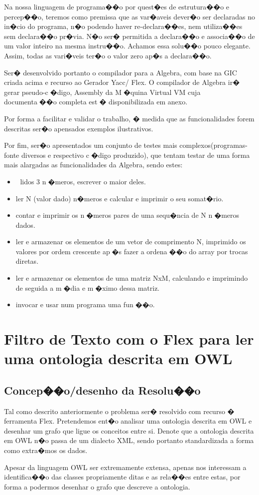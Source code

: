 \documentclass{report}
\begin{document}
Na nossa linguagem de programa��o por quest�es de estrutura��o e percep��o, teremos como premissa que as var�aveis dever�o ser declaradas no in�cio do programa, n�o podendo haver re-declara��es, nem utiliza��es sem declara��o pr�via. N�o ser� permitida a declara��o e associa��o de um valor inteiro na mesma instru��o. Achamos essa solu��o pouco elegante. Assim, todas as vari�veis ter�o o valor zero ap�s a declara��o.\par 

Ser� desenvolvido portanto o compilador para a Algebra, com base na GIC criada acima e recurso ao Gerador Yacc/ Flex.
O compilador de Algebra ir� gerar pseudo-c�digo, Assembly da M�quina Virtual VM cuja documenta��o completa
est� disponibilizada em anexo.\par
Por forma a facilitar e validar o trabalho, � medida que as funcionalidades forem descritas ser�o apensados  exemplos ilustrativos. \par 
Por fim, ser�o apresentados um conjunto de testes mais complexos(programas-fonte diversos e respectivo c�digo produzido), que tentam testar de uma forma mais alargadas as funcionalidades da Algebra, sendo estes:
\begin{itemize}
\item lidos 3 n�meros, escrever o maior deles.
 \item ler N (valor dado) n�meros e calcular e imprimir o seu somat�rio.
 \item contar e imprimir os n�meros pares de uma sequ�ncia de N n�meros dados.
 \item ler e armazenar os elementos de um vetor de comprimento N, imprimido os valores por ordem crescente ap�s fazer
a ordena��o do array por trocas diretas.
 \item ler e armazenar os elementos de uma matriz NxM, calculando e imprimindo de seguida a m�dia e m�ximo dessa matriz.
\item  invocar e usar num programa  uma fun��o.

    \end{itemize} 



    \chapter{Filtro de Texto com o Flex para ler uma ontologia descrita em OWL}
    \label{filtro}
    \section{Concep��o/desenho da Resolu��o}
    Tal como descrito anteriormente o problema ser� resolvido com recurso � ferramenta Flex. Pretendemos ent�o analisar uma ontologia descrita em OWL e  desenhar um grafo que ligue os conceitos entre si. Denote que a ontologia descrita em OWL n�o passa de um dialecto XML, sendo portanto standardizada a forma como extra�mos os dados. \par 
    Apesar da linguagem OWL ser extremamente extensa, apenas nos interessam a identifica��o das classes propriamente ditas e as rela��es entre estas, por forma a podermos desenhar o grafo que descreve a ontologia.\par 
\end{document}
